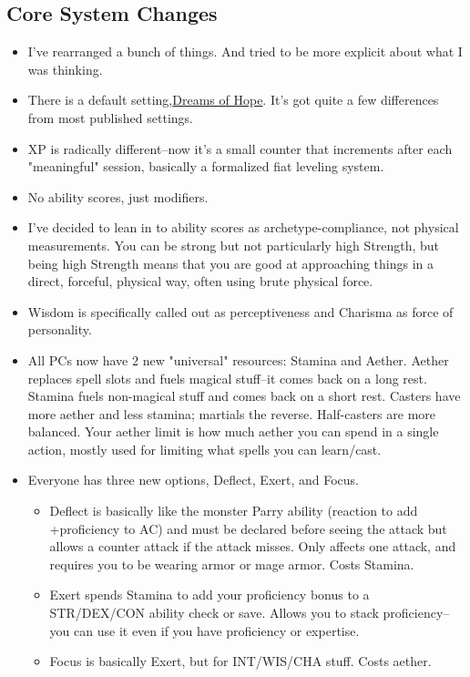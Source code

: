 \subsection*{Core System Changes}
\begin{itemize}
    \item I've rearranged a bunch of things. And tried to be more explicit about what I was thinking.
    \item There is a default setting,\href{https://wiki.admiralbenbo.org}{Dreams of Hope}. It's got quite a few differences from most published settings.
    \item XP is radically different--now it's a small counter that increments after each "meaningful" session, basically a formalized fiat leveling system.
    \item No ability scores, just modifiers.
    \item I've decided to lean in to ability scores as archetype-compliance, not physical measurements. You can be strong but not particularly high Strength, but being high Strength means that you are good at approaching things in a direct, forceful, physical way, often using brute physical force.
    \item Wisdom is specifically called out as perceptiveness and Charisma as force of personality.
    \item All PCs now have 2 new "universal" resources: Stamina and Aether. Aether replaces spell slots and fuels magical stuff--it comes back on a long rest. Stamina fuels non-magical stuff and comes back on a short rest. Casters have more aether and less stamina; martials the reverse. Half-casters are more balanced. Your aether limit is how much aether you can spend in a single action, mostly used for limiting what spells you can learn/cast.
    \item Everyone has three new options, Deflect, Exert, and Focus. 
    \begin{itemize}
        \item Deflect is basically like the monster Parry ability (reaction to add +proficiency to AC) and must be declared before seeing the attack but allows a counter attack if the attack misses. Only affects one attack, and requires you to be wearing armor or mage armor. Costs Stamina.
        \item Exert spends Stamina to add your proficiency bonus to a STR/DEX/CON ability check or save. Allows you to stack proficiency--you can use it even if you have proficiency or expertise.
        \item Focus is basically Exert, but for INT/WIS/CHA stuff. Costs aether.

\end{itemize}
\end{itemize}
